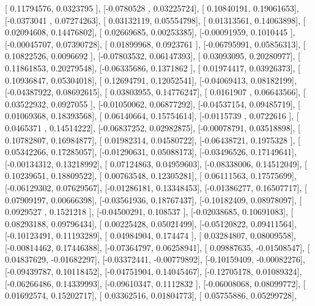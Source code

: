 \documentclass{article}
\begin{document}
       [ 0.11794576,  0.0323795 ],
       [-0.0780528 ,  0.03225724],
       [ 0.10840191,  0.19061653],
       [-0.0373041 ,  0.07274263],
       [ 0.03132119,  0.05554798],
       [ 0.01313561,  0.14063898],
       [ 0.02094608,  0.14476802],
       [ 0.02669685,  0.00253385],
       [-0.00091959,  0.1010445 ],
       [-0.00045707,  0.07390728],
       [ 0.01899968,  0.0923761 ],
       [-0.06795991,  0.05856313],
       [ 0.10822526,  0.0096692 ],
       [-0.07803532,  0.06147393],
       [ 0.03093095,  0.20280977],
       [ 0.11861853,  0.20279548],
       [-0.06335686,  0.1371862 ],
       [ 0.01974417,  0.03926373],
       [ 0.10936847,  0.05304018],
       [ 0.12694791,  0.12052541],
       [-0.04069413,  0.08182199],
       [-0.04387922,  0.08692615],
       [ 0.03803955,  0.14776247],
       [ 0.0161907 ,  0.06643566],
       [ 0.03522932,  0.0927055 ],
       [-0.01050062,  0.06877292],
       [-0.04537154,  0.09485719],
       [ 0.01069368,  0.18393568],
       [ 0.06140664,  0.15754614],
       [-0.0115739 ,  0.0722616 ],
       [ 0.0465371 ,  0.14514222],
       [-0.06837252,  0.02982875],
       [-0.00078791,  0.03518898],
       [ 0.10782807,  0.16984877],
       [ 0.01982314,  0.04580722],
       [-0.06438721,  0.1975328 ],
       [ 0.05342266,  0.17285057],
       [-0.01290631,  0.05088173],
       [-0.03496526,  0.17149641],
       [-0.00134312,  0.13218992],
       [ 0.07124863,  0.04959603],
       [-0.08338006,  0.14512049],
       [ 0.10239651,  0.18809522],
       [ 0.00763548,  0.12305281],
       [ 0.06111563,  0.17575699],
       [-0.06129302,  0.07629567],
       [-0.01286181,  0.13348453],
       [-0.01386277,  0.16507717],
       [ 0.07909197,  0.00666398],
       [-0.03561936,  0.18767437],
       [-0.10182409,  0.08978097],
       [ 0.0929527 ,  0.1521218 ],
       [-0.04500291,  0.108537  ],
       [-0.02038685,  0.10691083],
       [ 0.08293188,  0.09796434],
       [ 0.00225428,  0.05021499],
       [-0.05120822,  0.09411564],
       [-0.10123491,  0.11193289],
       [ 0.04984904,  0.174474  ],
       [ 0.03284807,  0.08009558],
       [-0.00814462,  0.17446388],
       [-0.07364797,  0.06258941],
       [ 0.09887635, -0.01508547],
       [ 0.04837629, -0.01682297],
       [-0.03372441, -0.00779892],
       [-0.10159409, -0.00082276],
       [-0.09439787,  0.10118452],
       [-0.04751904,  0.14045467],
       [-0.12705178,  0.01089324],
       [-0.06266486,  0.14339993],
       [-0.09610347,  0.1112832 ],
       [-0.06008068,  0.08099772],
       [ 0.01692574,  0.15202717],
       [ 0.03362516,  0.01804773],
       [ 0.05755886,  0.05299728],
\end{document}
